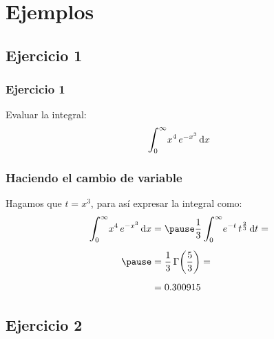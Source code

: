 \documentclass[12pt]{beamer}
\begin{document}
\section{Ejemplos}
\subsection{Ejercicio 1}

\begin{frame}
\frametitle{Ejercicio 1}
Evaluar la integral:
\pause
\begin{align*}
\scaleint{6ex}_{\bs 0}^{\infty} x^{4} \, e^{-x^{3}} \dd{x}
\end{align*}
\end{frame}
\begin{frame}
\frametitle{Haciendo el cambio de variable}
Hagamos que $t = x^{3}$, para así expresar la integral como:
\pause
\begin{eqnarray*}
\begin{aligned}
\scaleint{6ex}_{\bs 0}^{\infty} x^{4} \, e^{-x^{3}} \dd{x} &= \pause \dfrac{1}{3} \, \scaleint{6ex}_{\bs 0}^{\infty} e^{-t} \, t^{\frac{2}{3}} \dd{t} = \\[0.5em] \pause
&= \dfrac{1}{3} \, \Gamma \bigg( \dfrac{5}{3} \bigg) = \\[0.5em]
&= 0.300915
\end{aligned}
\end{eqnarray*}
\end{frame}

\subsection{Ejercicio 2}
\end{document}
